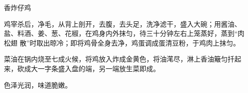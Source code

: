 %
%
%
%
%
%
%
\begin{recipe}[喇嘛仔鸡]{香炸仔鸡}

\ingredients


\preparation

\step 鸡宰杀后，净毛，从背上剖开，去腹，去头足，洗净滤干，盛入大碗；用酱油、
盐、料酒、姜、葱、花椒，在鸡身内外抹匀，待三十分钟左右上笼蒸好，蒸到“肉松翅
散”时取出晾冷；即将鸡骨全身去净，鸡蛋调成蛋清豆粉，于鸡肉上抹匀。

\step 菜油在锅内烧至七成火候，将鸡放入炸成金黄色，将油滗尽，淋上香油簸匀扦起
来，砍成大一字条盛入盘的端，另一端放生菜即成。

\features

色泽光润，味道脆嫩。

\end{recipe}

